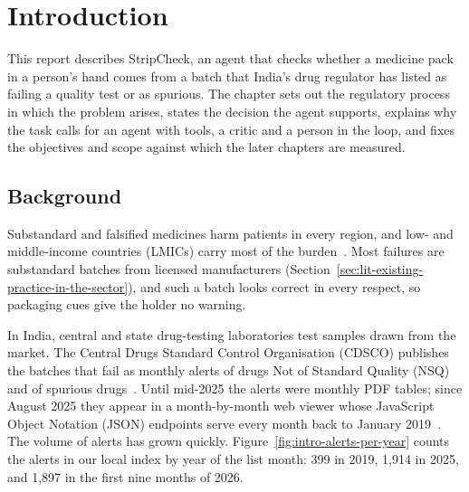 \chapter{Introduction}
\label{ch:intro}

This report describes StripCheck, an agent that checks whether a medicine pack in a person's hand
comes from a batch that India's drug regulator has listed as failing a quality test or as spurious.
The chapter sets out the regulatory process in which the problem arises, states the decision the
agent supports, explains why the task calls for an agent with tools, a critic and a person in the
loop, and fixes the objectives and scope against which the later chapters are measured.

\section{Background}
\label{sec:intro-background}

Substandard and falsified medicines harm patients in every region, and low- and middle-income
countries (LMICs) carry most of the burden~\cite{ozawa2018prevalence}. Most failures are
substandard batches from licensed manufacturers (Section~\ref{sec:lit-existing-practice-in-the-sector}),
and such a batch looks correct in every respect, so packaging cues give the holder no warning.

In India, central and state drug-testing laboratories test samples drawn from the market. The
Central Drugs Standard Control Organisation (CDSCO) publishes the batches that fail as monthly
alerts of drugs Not of Standard Quality (NSQ) and of spurious drugs~\cite{cdsco2026portal}.
Until mid-2025 the alerts were monthly PDF tables;
since August 2025 they appear in a month-by-month web viewer whose JavaScript Object Notation
(JSON) endpoints serve every month back to January 2019~\cite{cdsco2025nsqlink,cdsco2026nsqpage,cdsco2026portal}.
The volume of alerts has grown quickly. Figure~\ref{fig:intro-alerts-per-year}
counts the alerts in our local index by year of the list month: 399 in 2019, 1,914 in 2025, and
1,897 in the first nine months of 2026.

